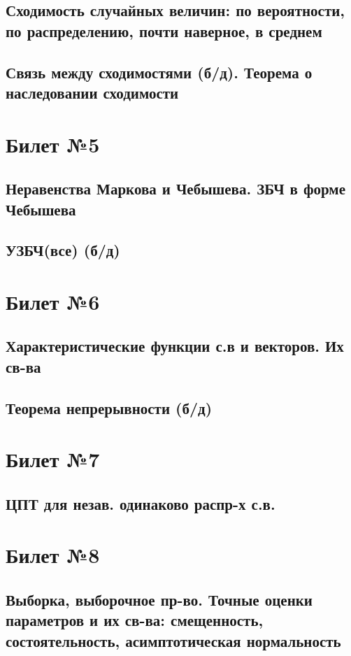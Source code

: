 \documentclass[a4paper]{article}
\begin{document}
\subsection{Сходимость случайных величин: по вероятности, по распределению, почти наверное, в среднем}
\subsection{Связь между сходимостями (б/д). Теорема о наследовании сходимости}

\section{Билет №5}
\subsection{Неравенства Маркова и Чебышева. ЗБЧ в форме Чебышева}
\subsection{УЗБЧ(все) (б/д)}

\section{Билет №6}
\subsection{Характеристические функции с.в и векторов. Их св-ва}
\subsection{Теорема непрерывности (б/д)}

\section{Билет №7}
\subsection{ЦПТ для незав. одинаково распр-х с.в.}

\section{Билет №8}
\subsection{Выборка, выборочное пр-во. Точные оценки параметров и их св-ва: смещенность, состоятельность, асимптотическая нормальность}
\end{document}
